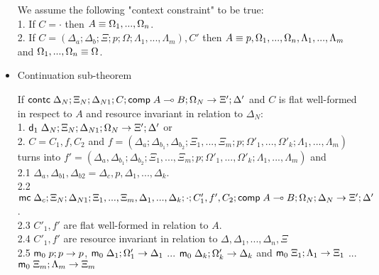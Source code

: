 \begin{itemize}
We assume the following "context constraint" to be true:\\

1. If $C = \cdot$ then $A \equiv \Omega_1, ..., \Omega_n$.\\
2. If $C = (\Delta_a; \Delta_b; \Xi; p; \Omega; \Lambda_1, ..., \Lambda_m), C'$ then $A \equiv p, \Omega_1, ..., \Omega_n, \Lambda_1, ..., \Lambda_m$ and $\Omega_1, ..., \Omega_n \equiv \Omega$.

\item Continuation sub-theorem

If $\mathsf{contc} \; \Delta_N; \Xi_N; \Delta_{N1}; C; \mathsf{comp} \; A \multimap B; \Omega_N \rightarrow \Xi'; \Delta'$ and $C$ is flat well-formed in respect to $A$ and resource invariant in relation to $\Delta_N$: \\
1. \hspace{1cm} $\mathsf{d}_1 \; \Delta_N; \Xi_N; \Delta_{N1}; \Omega_N \rightarrow \Xi'; \Delta'$ or \\
2. \hspace{1cm} $C = C_1, f, C_2$ and $f = (\Delta_a; \Delta_{b_1}, \Delta_{b_2}; \Xi_1, ..., \Xi_m; p; \Omega'_1, ..., \Omega'_k; \Lambda_1, ..., \Lambda_m)$ turns into $f' = (\Delta_a, \Delta_{b_1}; \Delta_{b_2}; \Xi_1, ..., \Xi_m; p; \Omega'_1, ..., \Omega'_k; \Lambda_1, ..., \Lambda_m)$ and\\
2.1 \hspace{2cm} $\Delta_a, \Delta_{b1}, \Delta_{b2} = \Delta_c, p, \Delta_1, ..., \Delta_k$. \\
2.2 \hspace{2cm} $\mathsf{mc} \; \Delta_c; \Xi_N; \Delta_{N1}; \Xi_1, ..., \Xi_m, \Delta_1, ..., \Delta_k; \cdot; C'_1, f', C_2; \mathsf{comp} \; A \multimap B; \Omega_N; \Delta_N \rightarrow \Xi'; \Delta'$. \\
2.3 \hspace{2cm} $C'_1, f'$ are flat well-formed in relation to $A$. \\
2.4 \hspace{2cm} $C'_1, f'$ are resource invariant in relation to $\Delta, \Delta_1, ..., \Delta_n, \Xi$ \\
2.5 \hspace{2cm} $\mathsf{m}_0 \; p; p \rightarrow p$, $\mathsf{m}_0 \; \Delta_1; \Omega'_1 \rightarrow \Delta_1$ ... $\mathsf{m}_0 \; \Delta_k; \Omega'_k \rightarrow \Delta_k$ and $\mathsf{m}_0 \; \Xi_1; \Lambda_1 \rightarrow \Xi_1$ ... $\mathsf{m}_0 \; \Xi_m; \Lambda_m \rightarrow \Xi_m$\\

\end{itemize}

